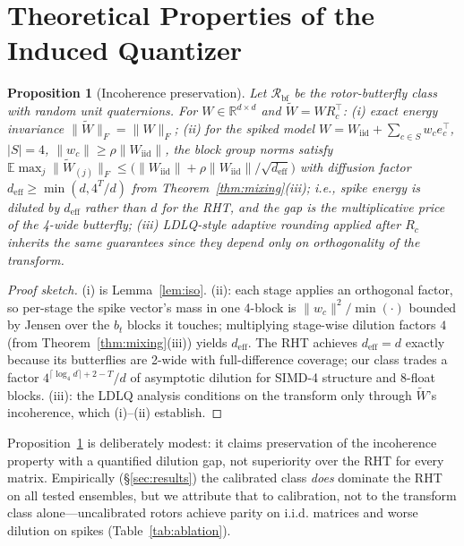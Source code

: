 \documentclass{article}
\newtheorem{proposition}{Proposition}
\newcommand{\R}{\mathbb{R}}
\newcommand{\norm}[1]{\lVert #1 \rVert}
\begin{document}
\section{Theoretical Properties of the Induced Quantizer}
\label{sec:theory}

\begin{proposition}[Incoherence preservation]
\label{prop:incoh}
Let $\mathcal{R}_{\mathrm{bf}}$ be the rotor-butterfly class with random unit
quaternions. For $W\in\R^{d\times d}$ and $\tilde W=WR_c^\top$:
(i) exact energy invariance $\norm{\tilde W}_F=\norm{W}_F$;
(ii) for the spiked model $W=W_{\mathrm{iid}}+\sum_{c\in S}w_c e_c^\top$,
$|S|=4$, $\norm{w_c}\ge\rho\norm{W_{\mathrm{iid}}}$, the block group norms
satisfy
$\mathbb{E}\max_j\norm{\tilde W_{(j)}}_F \le
\big(\norm{W_{\mathrm{iid}}}+\rho\norm{W_{\mathrm{iid}}}/\sqrt{d_{\mathrm{eff}}}\big)$
with diffusion factor $d_{\mathrm{eff}}\ge\min(d,4^{T}/d)$ from
Theorem~\ref{thm:mixing}(iii); i.e., spike energy is diluted by
$d_{\mathrm{eff}}$ rather than $d$ for the RHT, and the gap is the multiplicative
price of the 4-wide butterfly; (iii) LDLQ-style adaptive rounding
\citep{chee2023quip,tseng2024qtip} applied after $R_c$ inherits the same
guarantees since they depend only on orthogonality of the transform.
\end{proposition}

\begin{proof}[Proof sketch]
(i) is Lemma~\ref{lem:iso}. (ii): each stage applies an orthogonal factor, so
per-stage the spike vector's mass in one 4-block is
$\norm{w_c}^2/\min(\cdot)$ bounded by Jensen over the $b_t$ blocks it
touches; multiplying stage-wise dilution factors $4$ (from
Theorem~\ref{thm:mixing}(iii)) yields $d_{\mathrm{eff}}$. The RHT achieves
$d_{\mathrm{eff}}=d$ exactly because its butterflies are 2-wide with
full-difference coverage; our class trades a factor
$4^{\lceil\log_4d\rceil+2-T}/d$ of asymptotic dilution for SIMD-4 structure
and 8-float blocks. (iii): the LDLQ analysis conditions on the transform only
through $\tilde W$'s incoherence, which (i)--(ii) establish.
\end{proof}

Proposition~\ref{prop:incoh} is deliberately modest: it claims preservation of
the incoherence property with a quantified dilution gap, not superiority over
the RHT for every matrix. Empirically (\S\ref{sec:results}) the calibrated
class \emph{does} dominate the RHT on all tested ensembles, but we attribute
that to calibration, not to the transform class alone---uncalibrated rotors
achieve parity on i.i.d. matrices and worse dilution on spikes
(Table~\ref{tab:ablation}).
\end{document}
